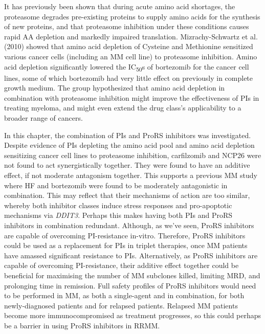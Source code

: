 It has previously been shown that during acute amino acid shortages, the proteasome degrades pre-existing proteins to supply amino acids for the synthesis of new proteins, and that proteasome inhibition under these conditions causes rapid AA depletion and markedly impaired translation\cite{vabulas2005protein}.
Mizrachy-Schwartz et al. (2010) showed that amino acid depletion of Cysteine and Methionine sensitized various cancer cells (including an MM cell line) to proteasome inhibition\cite{mizrachy2010amino}.
Amino acid depletion significantly lowered the IC\textsubscript{50}s of bortezomib for the cancer cell lines, some of which bortezomib had very little effect on previously in complete growth medium.
The group hypothesized that amino acid depletion in combination with proteasome inhibition might improve the effectiveness of PIs in treating myeloma, and might even extend the drug class's applicability to a broader range of cancers.

In this chapter, the combination of PIs and ProRS inhibitors was investigated.
Despite evidence of PIs depleting the amino acid pool and amino acid depletion sensitizing cancer cell lines to proteasome inhibition\cite{suraweera2012failure, mizrachy2010amino}, carfilzomib and NCP26 were not found to act synergistically together.
They were found to have an additive effect, if not moderate antagonism together.
This supports a previous MM study where HF and bortezomib were found to be moderately antagonistic in combination\cite{leiba2012halofuginone}.
This may reflect that their mechanisms of action are too similar, whereby both inhibitor classes induce stress responses and pro-apoptotic mechanisms via \textit{DDIT3}.
Perhaps this makes having both PIs and ProRS inhibitors in combination redundant.
Although, as we've seen, ProRS inhibitors are capable of overcoming PI-resistance in-vitro.
Therefore, ProRS inhibitors could be used as a replacement for PIs in triplet therapies, once MM patients have amassed significant resistance to PIs.
Alternatively, as ProRS inhibitors are capable of overcoming PI-resistance, their additive effect together could be beneficial for maximising the number of MM subclones killed, limiting MRD, and prolonging time in remission.
Full safety profiles of ProRS inhibitors would need to be performed in MM, as both a single-agent and in combination, for both newly-diagnosed patients and for relapsed patients.
Relapsed MM patients become more immunocompromised as treatment progresses, so this could perhaps be a barrier in using ProRS inhibitors in RRMM.

